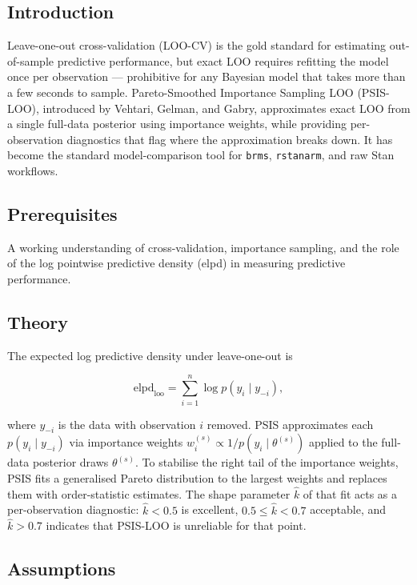 \documentclass[
]{article}
\author{}
\date{\vspace{-2.5em}}
\begin{document}
\subsection{Introduction}\label{introduction}

Leave-one-out cross-validation (LOO-CV) is the gold standard for
estimating out-of-sample predictive performance, but exact LOO requires
refitting the model once per observation --- prohibitive for any
Bayesian model that takes more than a few seconds to sample.
Pareto-Smoothed Importance Sampling LOO (PSIS-LOO), introduced by
Vehtari, Gelman, and Gabry, approximates exact LOO from a single
full-data posterior using importance weights, while providing
per-observation diagnostics that flag where the approximation breaks
down. It has become the standard model-comparison tool for
\texttt{brms}, \texttt{rstanarm}, and raw Stan workflows.

\subsection{Prerequisites}\label{prerequisites}

A working understanding of cross-validation, importance sampling, and
the role of the log pointwise predictive density (elpd) in measuring
predictive performance.

\subsection{Theory}\label{theory}

The expected log predictive density under leave-one-out is

\[\mathrm{elpd}_{\mathrm{loo}} = \sum_{i=1}^n \log p(y_i \mid y_{-i}),\]

where \(y_{-i}\) is the data with observation \(i\) removed. PSIS
approximates each \(p(y_i \mid y_{-i})\) via importance weights
\(w_i^{(s)} \propto 1 / p(y_i \mid \theta^{(s)})\) applied to the
full-data posterior draws \(\theta^{(s)}\). To stabilise the right tail
of the importance weights, PSIS fits a generalised Pareto distribution
to the largest weights and replaces them with order-statistic estimates.
The shape parameter \(\hat k\) of that fit acts as a per-observation
diagnostic: \(\hat k < 0.5\) is excellent, \(0.5 \le \hat k < 0.7\)
acceptable, and \(\hat k > 0.7\) indicates that PSIS-LOO is unreliable
for that point.

\subsection{Assumptions}\label{assumptions}
\end{document}
